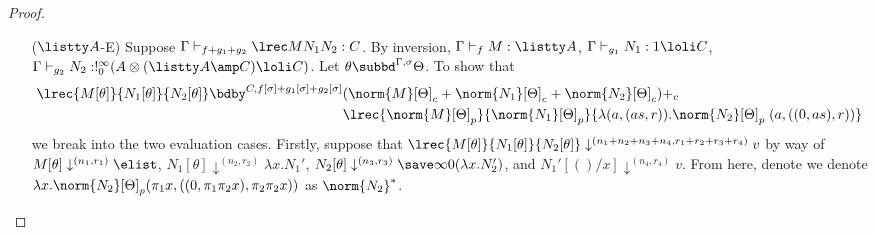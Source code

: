 \begin{proof}
\begin{itemize}
\item[($\listty A$-E)] Suppose $\Gamma \vdash_{f+g_1+g_2} \lrec M {N_1} {N_2} : C$. By inversion, $\Gamma \vdash_f M : \listty A$, $\Gamma \vdash_{g_1} N_1 : 1 \loli C$, $\Gamma \vdash_{g_2} N_2 : !^\infty_0 (A \otimes (\listty A \amp C) \loli C)$. Let $\theta \subbd^{\Gamma,\sigma} \Theta$. To show that
\begin{align*}
\lrec {M[\theta]} {N_1[\theta]} {N_2[\theta]} \bdby^{C,f[\sigma] + g_1[\sigma] + g_2[\sigma]} &(\norm{M}[\Theta]_c + \norm{N_1}[\Theta]_c + \norm{N_2}[\Theta]_c) +_c\\ 
&\lrec {\norm{M}[\Theta]_p} {\norm{N_1}[\Theta]_p} {\lambda (a,(as,r)). \norm{N_2}[\Theta]_p\;  (a,((0,as),r))}
\end{align*}
we break into the two evaluation cases. Firstly, suppose that $\lrec {M[\theta]} {N_1[\theta]} {N_2[\theta]} \downarrow^{(n_1+n_2+n_3+n_4,r_1+r_2+r_3+r_4)} v$ by way of $M[\theta] \downarrow^{(n_1,r_1)} \elist$, $N_1[\theta] \downarrow^{(n_2,r_2)} \lambda x.N_1'$, $N_2[\theta] \downarrow^{(n_3,r_3)} \save \infty 0 {(\lambda x.N_2')}$, and $N_1'[()/x] \downarrow^{(n_4,r_4)} v$. From here, denote we denote $\lambda x. \norm{N_2}[\Theta]_p (\pi_1 x,((0,\pi_1 \pi_2 x),\pi_2\pi_2 x))$ as $\norm{N_2}^*$.


\end{itemize}
\end{proof}
